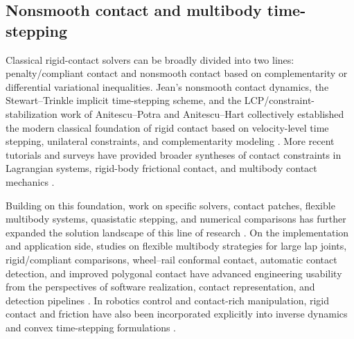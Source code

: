\subsection{Nonsmooth contact and multibody time-stepping}
Classical rigid-contact solvers can be broadly divided into two lines: penalty/compliant contact and nonsmooth contact based on complementarity or differential variational inequalities. Jean's nonsmooth contact dynamics, the Stewart--Trinkle implicit time-stepping scheme, and the LCP/constraint-stabilization work of Anitescu--Potra and Anitescu--Hart collectively established the modern classical foundation of rigid contact based on velocity-level time stepping, unilateral constraints, and complementarity modeling \cite{jean1999nonsmooth,stewart1996implicit,anitescu1997formulating,anitescu2004constraint,anitescu2010iterative,tasora2011matrixfree,pfeiffer2012nonsmooth}. More recent tutorials and surveys have provided broader syntheses of contact constraints in Lagrangian systems, rigid-body frictional contact, and multibody contact mechanics \cite{contacttutorial2016,contactconstraints2016,flores2022contact,wang2021nonsmooth,peng2022sensitivity}.

Building on this foundation, work on specific solvers, contact patches, flexible multibody systems, quasistatic stepping, and numerical comparisons has further expanded the solution landscape of this line of research \cite{melanz2017comparison,catchingup2018,contactpatch2018,symplecticcontact2019,flexiblecontact2020,convexquasistatic2021,effectivemass2022,contactbasics2023,predictioncorrection2025,contactmultiscale2025}. On the implementation and application side, studies on flexible multibody strategies for large lap joints, rigid/compliant comparisons, wheel--rail conformal contact, automatic contact detection, and improved polygonal contact have advanced engineering usability from the perspectives of software realization, contact representation, and detection pipelines \cite{lapjoints2016,pazouki2017compliant,conformalwheel2020,autocontact2023,polygonalcontact2023,nencioni2025conformal,gradientcontact2025}. In robotics control and contact-rich manipulation, rigid contact and friction have also been incorporated explicitly into inverse dynamics and convex time-stepping formulations \cite{inversedynamics2016,convexquasistatic2021}.


